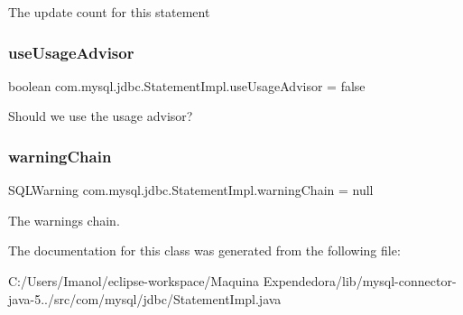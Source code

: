 The update count for this statement \mbox{\label{classcom_1_1mysql_1_1jdbc_1_1_statement_impl_a1b1dbd4c597f5286ad18d8b0337bf851}} 
\subsubsection{\texorpdfstring{use\+Usage\+Advisor}{useUsageAdvisor}}
{\footnotesize\ttfamily boolean com.\+mysql.\+jdbc.\+Statement\+Impl.\+use\+Usage\+Advisor = false\hspace{0.3cm}{\ttfamily [protected]}}

Should we use the usage advisor? \mbox{\label{classcom_1_1mysql_1_1jdbc_1_1_statement_impl_a9e37a58ec76d5d660fff09e917422489}} 
\subsubsection{\texorpdfstring{warning\+Chain}{warningChain}}
{\footnotesize\ttfamily S\+Q\+L\+Warning com.\+mysql.\+jdbc.\+Statement\+Impl.\+warning\+Chain = null\hspace{0.3cm}{\ttfamily [protected]}}

The warnings chain. 

The documentation for this class was generated from the following file\+:\begin{DoxyCompactItemize}
\item 
C\+:/\+Users/\+Imanol/eclipse-\/workspace/\+Maquina Expendedora/lib/mysql-\/connector-\/java-\/5../src/com/mysql/jdbc/Statement\+Impl.\+java\end{DoxyCompactItemize}
